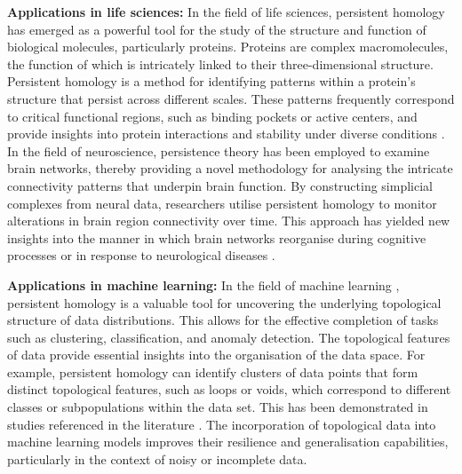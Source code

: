 \textbf{Applications in life sciences:} In the field of life sciences, persistent homology has emerged as a powerful tool for the study of the structure and function of biological molecules, particularly proteins. Proteins are complex macromolecules, the function of which is intricately linked to their three-dimensional structure. Persistent homology is a method for identifying patterns within a protein's structure that persist across different scales. These patterns frequently correspond to critical functional regions, such as binding pockets or active centers, and provide insights into protein interactions and stability under diverse conditions \cite{Kovacev-Nikolic2016}. In the field of neuroscience, persistence theory has been employed to examine brain networks, thereby providing a novel methodology for analysing the intricate connectivity patterns that underpin brain function. By constructing simplicial complexes from neural data, researchers utilise persistent homology  to monitor alterations in brain region connectivity over time. This approach has yielded new insights into the manner in which brain networks reorganise during cognitive processes or in response to neurological diseases \cite{Giusti2016, unger2023simplex}.

\textbf{Applications in machine learning:} In the field of machine learning , persistent homology is a valuable tool for uncovering the underlying topological structure of data distributions. This allows for the effective completion of tasks such as clustering, classification, and anomaly detection. The topological features of data provide essential insights into the organisation of the data space. For example, persistent homology can identify clusters of data points that form distinct topological features, such as loops or voids, which correspond to different classes or subpopulations within the data set. This has been demonstrated in studies referenced in the literature \cite{Hofer2017,melodia2018deep,melodia2020persistent,melodia2021estimate,melodia2021homological}. The incorporation of topological data into machine learning models improves their resilience and generalisation capabilities, particularly in the context of noisy or incomplete data.

